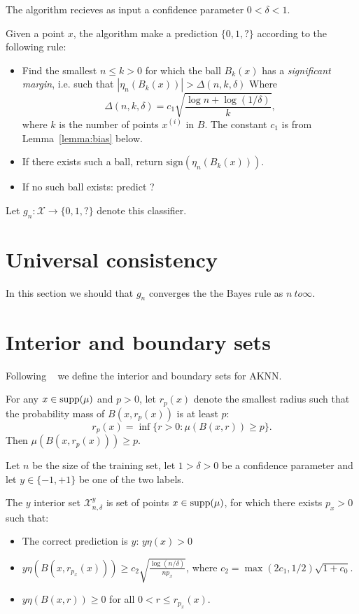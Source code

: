 \documentclass{article}
\def\X{{\mathcal X}}
\def\supp{{\rm supp}}
\newcommand{\sign}{\mbox{sign}}
\newcommand{\algname}{\textsc{AKNN}}
\newcommand{\comment}[3]{}  %
\newcommand{\shay}[1]{\comment{purple}{Shay}{#1}}
\newcommand{\yoav}[1]{\comment{green}{Yoav}{#1}}
\begin{document}
The algorithm recieves as input a confidence parameter $0 < \delta <1$.

Given a point $x$, the algorithm make a prediction $\{0,1,?\}$  according to the following rule:

\begin{itemize}
\item Find the smallest $n \leq k>0$ for which the ball $B_k(x)$ has a
  {\em significant margin}, i.e. such that $\left|\eta_n(B_k(x))\right| > \Delta(n,k,\delta)$
  Where
  $$ \Delta(n,k,\delta) = c_1 \sqrt{\frac{\log n + \log (1/\delta)}{k}}, $$
where $k$ is the number of points $x^{(i)}$ in $B$. The constant $c_1$ is from Lemma~\ref{lemma:bias} below.
\shay{I presume $d_0$ denotes the VC dimension of the family of all balls? 
$d_0$ should be set to $1$ in the case of the ``expected-case'' analysis}
\yoav{I suggest we push $d_0$ to the end of the paper}
\item If there exists such a ball, return $\sign(\eta_n(B_k(x)))$.
\item If no such ball exists: predict ?
\end{itemize}
Let $g_n: \X \rightarrow \{0,1,?\}$ denote this classifier.

\section{Universal consistency}
\label{sec:universal-consistency}
In this section we should that $g_n$ converges the the Bayes rule as
$n \ to \infty$.


\section{Interior and boundary sets}
Following ~\cite{} we define the interior and boundary sets for \algname.

For any $x \in \supp(\mu)$ and $p > 0$, let $r_p(x)$ denote the
smallest radius such that the probability mass of $B(x, r_p(x))$ is at
least $p$:
$$ r_p(x) = \inf \{r > 0: \mu(B(x,r)) \geq p \} .$$
Then $\mu(B(x,r_p(x))) \geq p$.

Let $n$ be the size of the training set, let $1>\delta>0$ be a
confidence parameter and let $y \in \{-1,+1\}$ be one of the two labels.

The $y$ interior set $\X^y_{n,\delta}$ is set of points $x \in \supp(\mu)$, for which 
there exists $p_x > 0$ such that:
\begin{itemize}
\item The correct prediction is $y$: $y \eta(x) > 0$
\item $y \eta(B(x,r_{p_x}(x))) \geq c_2 \sqrt{\frac{\log (n/\delta)}{np_x}}$, where $c_2 = \max(2c_1, 1/2) \sqrt{1+c_0}$. 
\item $y \eta(B(x,r)) \geq 0 $ for all $0 < r \leq r_{p_x}(x)$. 
\end{itemize}
\end{document}
